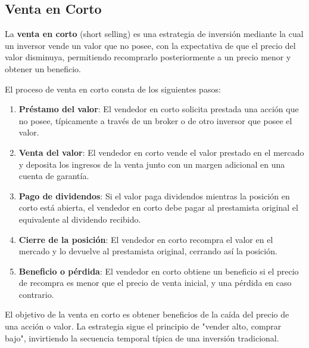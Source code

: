 \subsection{Venta en Corto}

\begin{definicion}
La \textbf{venta en corto} (short selling) es una estrategia de inversión mediante la cual un inversor vende un valor que no posee, con la expectativa de que el precio del valor disminuya, permitiendo recomprarlo posteriormente a un precio menor y obtener un beneficio.
\end{definicion}

\begin{teorema}
El proceso de venta en corto consta de los siguientes pasos:

\begin{enumerate}
\item \textbf{Préstamo del valor}: El vendedor en corto solicita prestada una acción que no posee, típicamente a través de un broker o de otro inversor que posee el valor.

\item \textbf{Venta del valor}: El vendedor en corto vende el valor prestado en el mercado y deposita los ingresos de la venta junto con un margen adicional en una cuenta de garantía.

\item \textbf{Pago de dividendos}: Si el valor paga dividendos mientras la posición en corto está abierta, el vendedor en corto debe pagar al prestamista original el equivalente al dividendo recibido.

\item \textbf{Cierre de la posición}: El vendedor en corto recompra el valor en el mercado y lo devuelve al prestamista original, cerrando así la posición.

\item \textbf{Beneficio o pérdida}: El vendedor en corto obtiene un beneficio si el precio de recompra es menor que el precio de venta inicial, y una pérdida en caso contrario.
\end{enumerate}
\end{teorema}

\begin{proposicion}
El objetivo de la venta en corto es obtener beneficios de la caída del precio de una acción o valor. La estrategia sigue el principio de "vender alto, comprar bajo", invirtiendo la secuencia temporal típica de una inversión tradicional.
\end{proposicion}

